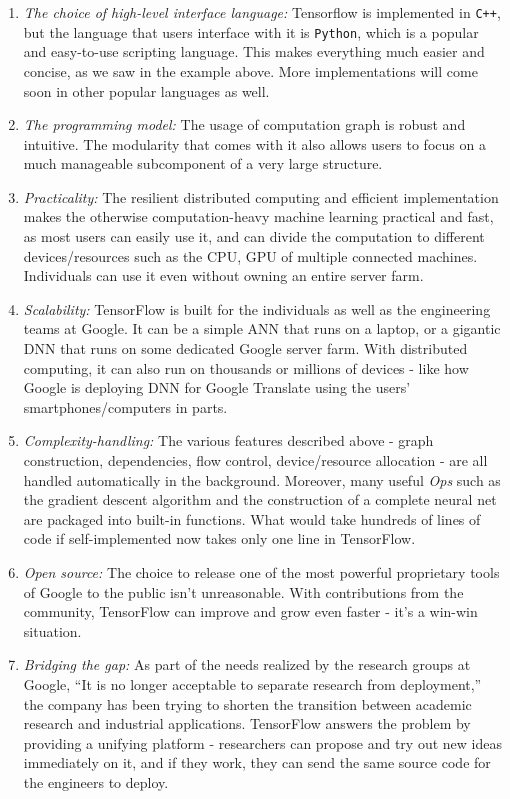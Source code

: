 \documentclass[12pt]{article}  %
\begin{document}
\begin{enumerate}
	\item \emph{The choice of high-level interface language:} Tensorflow is implemented in {\tt C++}, but the language that users interface with it is {\tt Python}, which is a popular and easy-to-use scripting language. This makes everything much easier and concise, as we saw in the example above. More implementations will come soon in other popular languages as well.
	\item \emph{The programming model:} The usage of computation graph is robust and intuitive. The modularity that comes with it also allows users to focus on a much manageable subcomponent of a very large structure.
	\item \emph{Practicality:} The resilient distributed computing and efficient implementation makes the otherwise computation-heavy machine learning practical and fast, as most users can easily use it, and can divide the computation to different devices/resources such as the CPU, GPU of multiple connected machines. Individuals can use it even without owning an entire server farm.
	\item \emph{Scalability:} TensorFlow is built for the individuals as well as the engineering teams at Google. It can be a simple ANN that runs on a laptop, or a gigantic DNN that runs on some dedicated Google server farm. With distributed computing, it can also run on thousands or millions of devices - like how Google is deploying DNN for Google Translate using the users' smartphones/computers in parts.
	\item \emph{Complexity-handling:} The various features described above - graph construction, dependencies, flow control, device/resource allocation - are all handled automatically in the background. Moreover, many useful \emph{Ops} such as the gradient descent algorithm and the construction of a complete neural net are packaged into built-in functions. What would take hundreds of lines of code if self-implemented now takes only one line in TensorFlow.
	\item \emph{Open source:} The choice to release one of the most powerful proprietary tools of Google to the public isn't unreasonable. With contributions from the community, TensorFlow can improve and grow even faster - it's a win-win situation.
	\item \emph{Bridging the gap:} As part of the needs realized by the research groups at Google, ``It is no longer acceptable to separate research from deployment,'' the company has been trying to shorten the transition between academic research and industrial applications. TensorFlow answers the problem by providing a unifying platform - researchers can propose and try out new ideas immediately on it, and if they work, they can send the same source code for the engineers to deploy.
\end{enumerate}
\end{document}
